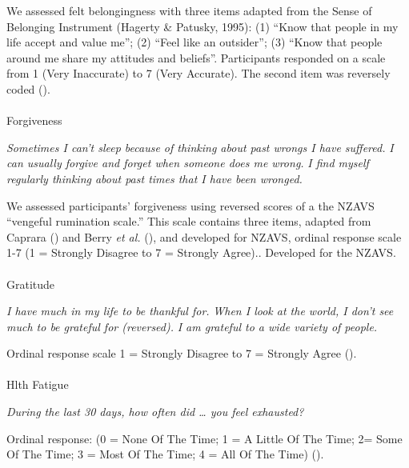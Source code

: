 \documentclass[
  single column]{article}
\makeatletter
\let\oldparagraph\paragraph
\renewcommand{\paragraph}{
    \@ifstar
      \xxxParagraphStar
      \xxxParagraphNoStar
  }
\newcommand{\xxxParagraphStar}[1]{\oldparagraph*{#1}\mbox{}}
\newcommand{\xxxParagraphNoStar}[1]{\oldparagraph{#1}\mbox{}}
\makeatother
\begin{document}
We assessed felt belongingness with three items adapted from the Sense
of Belonging Instrument (Hagerty \& Patusky, 1995): (1) ``Know that
people in my life accept and value me''; (2) ``Feel like an outsider'';
(3) ``Know that people around me share my attitudes and beliefs''.
Participants responded on a scale from 1 (Very Inaccurate) to 7 (Very
Accurate). The second item was reversely coded
().

\paragraph{Forgiveness}\label{forgiveness-1}

\emph{Sometimes I can't sleep because of thinking about past wrongs I
have suffered.} \emph{I can usually forgive and forget when someone does
me wrong.} \emph{I find myself regularly thinking about past times that
I have been wronged.}

We assessed participants' forgiveness using reversed scores of a the
NZAVS ``vengeful rumination scale.'' This scale contains three items,
adapted from Caprara () and
Berry \emph{et al.} (), and
developed for NZAVS, ordinal response scale 1-7 (1 = Strongly Disagree
to 7 = Strongly Agree).. Developed for the NZAVS.

\paragraph{Gratitude}\label{gratitude-1}

\emph{I have much in my life to be thankful for.} \emph{When I look at
the world, I don't see much to be grateful for (reversed).} \emph{I am
grateful to a wide variety of people.}

Ordinal response scale 1 = Strongly Disagree to 7 = Strongly Agree
().

\paragraph{Hlth Fatigue}\label{hlth-fatigue}

\emph{During the last 30 days, how often did \ldots{} you feel
exhausted?}

Ordinal response: (0 = None Of The Time; 1 = A Little Of The Time; 2=
Some Of The Time; 3 = Most Of The Time; 4 = All Of The Time)
().
\end{document}
